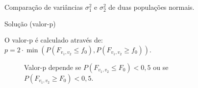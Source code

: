\documentclass[9pt]{beamer}
\begin{document}
\begin{frame}{Comparação de variâncias $\sigma_1^2$ e $\sigma_2^2$ de duas populações normais.}

\begin{block}{Solução (valor-p)}

O valor-p é calculado através de: $p = 2\cdot \min \left( P(F_{v_1, v_2} \leq f_0), P(F_{v_1, v_2} \geq f_0)  \right).$


\begin{figure}[htbp]
		\centering
		\caption{Valor-p depende se $P\left( F_{v_1, v_2} \leq F_0 \right)< 0,5$ ou se $P\left( F_{v_1, v_2} \geq F_0 \right) < 0,5$.}
\end{figure}

\end{block}

\end{frame}
\end{document}
